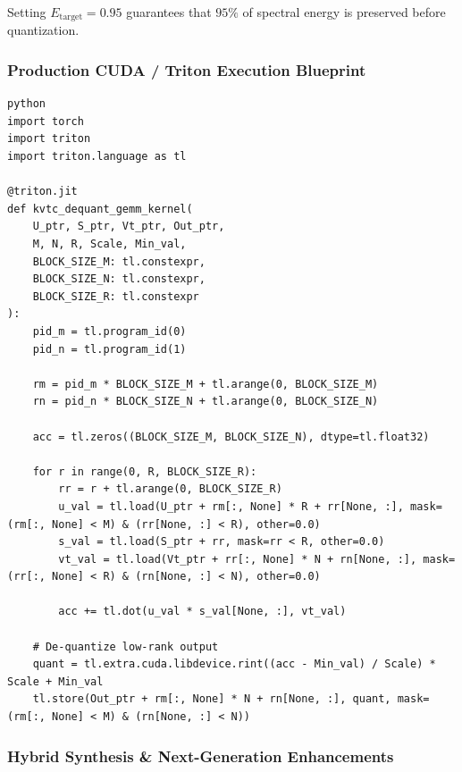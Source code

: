Setting $E_{\text{target}} = 0.95$ guarantees that $95\%$ of spectral energy is preserved before quantization.


\subsubsection*{Production CUDA / Triton Execution Blueprint}

\vspace{0.5em}
\begin{mdframed}[backgroundcolor=codebg, linecolor=codeframe, linewidth=1pt, roundcorner=4pt, innerleftmargin=2pt, innerrightmargin=5pt, innertopmargin=5pt, innerbottommargin=5pt]
\begin{lstlisting}
python
import torch
import triton
import triton.language as tl

@triton.jit
def kvtc_dequant_gemm_kernel(
    U_ptr, S_ptr, Vt_ptr, Out_ptr,
    M, N, R, Scale, Min_val,
    BLOCK_SIZE_M: tl.constexpr,
    BLOCK_SIZE_N: tl.constexpr,
    BLOCK_SIZE_R: tl.constexpr
):
    pid_m = tl.program_id(0)
    pid_n = tl.program_id(1)

    rm = pid_m * BLOCK_SIZE_M + tl.arange(0, BLOCK_SIZE_M)
    rn = pid_n * BLOCK_SIZE_N + tl.arange(0, BLOCK_SIZE_N)

    acc = tl.zeros((BLOCK_SIZE_M, BLOCK_SIZE_N), dtype=tl.float32)

    for r in range(0, R, BLOCK_SIZE_R):
        rr = r + tl.arange(0, BLOCK_SIZE_R)
        u_val = tl.load(U_ptr + rm[:, None] * R + rr[None, :], mask=(rm[:, None] < M) & (rr[None, :] < R), other=0.0)
        s_val = tl.load(S_ptr + rr, mask=rr < R, other=0.0)
        vt_val = tl.load(Vt_ptr + rr[:, None] * N + rn[None, :], mask=(rr[:, None] < R) & (rn[None, :] < N), other=0.0)

        acc += tl.dot(u_val * s_val[None, :], vt_val)

    # De-quantize low-rank output
    quant = tl.extra.cuda.libdevice.rint((acc - Min_val) / Scale) * Scale + Min_val
    tl.store(Out_ptr + rm[:, None] * N + rn[None, :], quant, mask=(rm[:, None] < M) & (rn[None, :] < N))
\end{lstlisting}
\end{mdframed}
\vspace{0.5em}


\subsubsection*{Hybrid Synthesis \& Next-Generation Enhancements}

